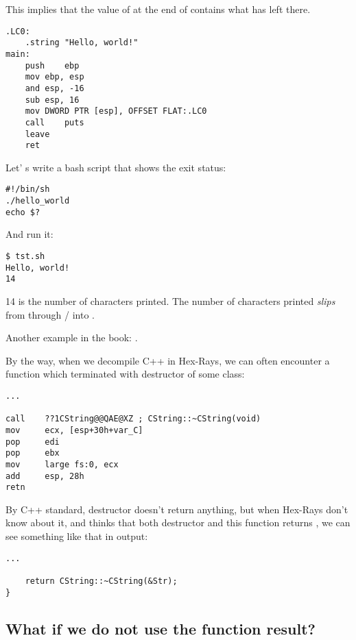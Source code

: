 This implies that the value of \EAX at the end of \main contains what \puts has left there.

\begin{lstlisting}[caption=GCC 4.8.1,style=customasmx86]
.LC0:
	.string	"Hello, world!"
main:
	push	ebp
	mov	ebp, esp
	and	esp, -16
	sub	esp, 16
	mov	DWORD PTR [esp], OFFSET FLAT:.LC0
	call	puts
	leave
	ret
\end{lstlisting}


Let' s write a bash script that shows the exit status:

\begin{lstlisting}[caption=tst.sh]
#!/bin/sh
./hello_world
echo $?
\end{lstlisting}

And run it:

\begin{lstlisting}
$ tst.sh 
Hello, world!
14
\end{lstlisting}

14 is the number of characters printed.
The number of characters printed \textit{slips} from \printf{} through / into .

Another example in the book: .

By the way, when we decompile C++ in Hex-Rays, we can often encounter a function which terminated with destructor of
some class:

\begin{lstlisting}[style=customasmx86]
...

call    ??1CString@@QAE@XZ ; CString::~CString(void)
mov     ecx, [esp+30h+var_C]
pop     edi
pop     ebx
mov     large fs:0, ecx
add     esp, 28h
retn
\end{lstlisting}

By C++ standard, destructor doesn't return anything, but when Hex-Rays don't know about it, and thinks that both
destructor and this function returns \Tint, we can see something like that in output:

\begin{lstlisting}[style=customc]
...

	return CString::~CString(&Str);
}
\end{lstlisting}

\subsection{What if we do not use the function result?}

